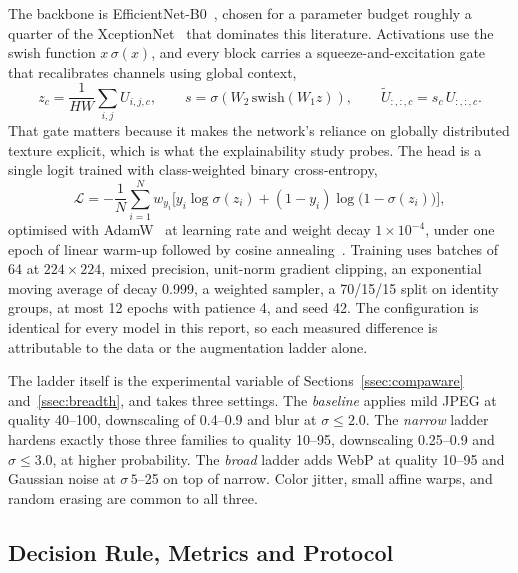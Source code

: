 \documentclass[journal,onecolumn]{IEEEtran}
\begin{document}
The backbone is EfficientNet-B0~\cite{tan2019efficientnet}, chosen for a
parameter budget roughly a quarter of the XceptionNet~\cite{chollet2017xception}
that dominates this literature. Activations use the swish function $x\,\sigma(x)$,
and every block carries a squeeze-and-excitation gate~\cite{hu2018senet} that
recalibrates channels
using global context,
\begin{equation}
  z_{c} = \frac{1}{HW} \sum_{i,j} U_{i,j,c},
  \qquad
  s = \sigma\!\left( W_{2}\,\mathrm{swish}(W_{1} z) \right),
  \qquad
  \tilde{U}_{:,:,c} = s_{c}\, U_{:,:,c} .
  \label{eq:se}
\end{equation}
That gate matters because it makes the network's reliance on globally distributed
texture explicit, which is what the explainability study probes. The head is a
single logit trained with class-weighted binary cross-entropy,
\begin{equation}
  \mathcal{L} = -\frac{1}{N}\sum_{i=1}^{N} w_{y_i}
  \Big[ y_i \log \sigma(z_i) + (1-y_i)\log\big(1-\sigma(z_i)\big) \Big],
  \label{eq:bce}
\end{equation}
optimised with AdamW~\cite{loshchilov2019adamw} at learning rate and weight
decay $1\times10^{-4}$, under one epoch of linear warm-up followed by cosine
annealing~\cite{loshchilov2017sgdr}. Training uses batches
of 64 at
$224 \times 224$, mixed precision, unit-norm gradient clipping, an exponential
moving average of decay 0.999, a weighted sampler, a 70/15/15 split on identity
groups, at most 12 epochs with patience 4, and seed 42. The configuration is
identical for every model in this report, so each measured difference is
attributable to the data or the augmentation ladder alone.

The ladder itself is the experimental variable of Sections~\ref{ssec:compaware}
and~\ref{ssec:breadth}, and takes three settings. The \emph{baseline} applies
mild JPEG at quality 40--100, downscaling of 0.4--0.9 and blur at
$\sigma \leq 2.0$. The \emph{narrow} ladder hardens exactly those three families
to quality 10--95, downscaling 0.25--0.9 and $\sigma \leq 3.0$, at higher
probability. The \emph{broad} ladder adds WebP at quality 10--95 and Gaussian
noise at $\sigma\,5$--25 on top of narrow. Color jitter, small affine warps, and
random erasing are common to all three.

\subsection{Decision Rule, Metrics and Protocol}
\label{ssec:protocol}
\end{document}
